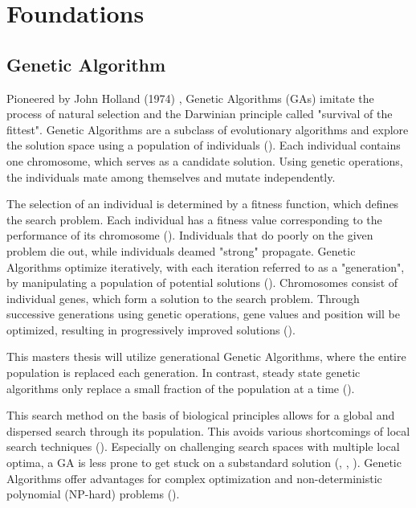 \chapter{Foundations}
\label{chap:foundation}

\section{Genetic Algorithm}
\label{chap:foundation:genetic_algorithm}

Pioneered by John Holland (1974) , Genetic Algorithms (GAs) imitate the process of natural selection and the Darwinian principle called "survival of the fittest". Genetic Algorithms are a subclass of evolutionary algorithms and explore the solution space using a population of individuals (\cite{mills_determining_2015}). Each individual contains one chromosome, which serves as a candidate solution. Using genetic operations, the individuals mate among themselves and mutate independently. 

The selection of an individual is determined by a fitness function, which defines the search problem. Each individual has a fitness value corresponding to the performance of its chromosome (\cite{majumdar_genetic_2015}). Individuals that do poorly on the given problem die out, while individuals deamed "strong" propagate. Genetic Algorithms optimize iteratively, with each iteration referred to as a "generation", by manipulating a population of potential solutions (\cite{srinivas_genetic_1994}).
Chromosomes consist of individual genes, which form a solution to the search problem. Through successive generations using genetic operations, gene values and position will be optimized, resulting in progressively improved solutions (\cite{srinivas_genetic_1994}).

This masters thesis will utilize generational Genetic Algorithms, where the entire population is replaced each generation. In contrast, steady state genetic algorithms only replace a small fraction of the population at a time (\cite{srinivas_genetic_1994}).

This search method on the basis of biological principles allows for a global and dispersed search through its population. This avoids various shortcomings of local search techniques (\cite{grefenstette_optimization_1986}). Especially on challenging search spaces with multiple local optima, a GA is less prone to get stuck on a substandard solution (\cite{katoch_review_2021}, \cite{xia_genetic_2019}, \cite{majumdar_genetic_2015}). Genetic Algorithms offer advantages for complex optimization and non-deterministic polynomial (NP-hard) problems (\cite{hussain_trade-off_2020}).

